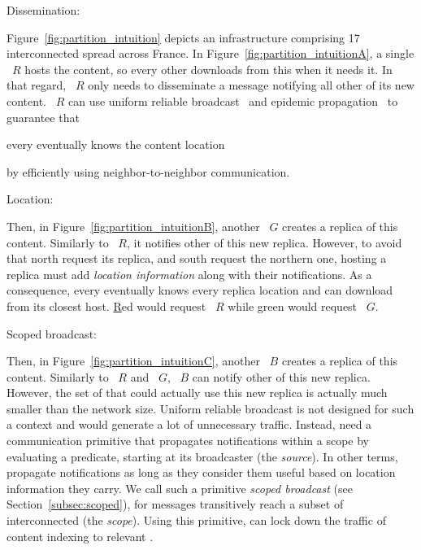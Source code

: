 \begin{asparadesc}
\item [Dissemination:]

Figure~\ref{fig:partition_intuition} depicts an infrastructure
comprising 17 interconnected \processes spread across France. In
Figure~\ref{fig:partition_intuitionA}, a single \Process~$R$ hosts the
content, so every other \process downloads from this \process when it
needs it. In that regard, \Process~$R$ only needs to disseminate a
message notifying all other \processes of its new
content. \Process~$R$ can use uniform reliable
broadcast~\cite{hadzilacos1994modular} and epidemic
propagation~\cite{epidemic-protocol} to guarantee that
\begin{inparaenum}[(i)]
\item every \process eventually knows the content location
\item by efficiently using neighbor-to-neighbor communication.
\end{inparaenum}

\item [Location:]

Then, in Figure~\ref{fig:partition_intuitionB}, another \Process~$G$
creates a replica of this content. Similarly to \Process~$R$, it
notifies other \processes of this new replica. However, to avoid that
north \processes request its replica, and south \processes request the
northern one, \processes hosting a replica must add \emph{location
information} along with their notifications. As a consequence, every
\process eventually knows every replica location and can download from
its closest host. \underline{R}ed \processes would request
\Process~$R$ while \underline{g}reen \processes would request
\Process~$G$.

\item [Scoped broadcast:]

Then, in Figure~\ref{fig:partition_intuitionC}, another \Process~$B$
creates a replica of this content. Similarly to \Process~$R$ and
\Process~$G$, \Process~$B$ can notify other \processes of this new
replica. However, the set of \processes that could actually use this
new replica is actually much smaller than the network size. Uniform
reliable broadcast is not designed for such a context and would
generate a lot of unnecessary traffic. Instead, \processes need a
communication primitive that propagates notifications within a scope
by evaluating a predicate, starting at its broadcaster (the
\emph{source}).  In other terms, \processes propagate notifications as
long as they consider them useful based on location information they
carry. We call such a primitive \emph{scoped broadcast} (see
Section~\ref{subsec:scoped}), for messages transitively reach a subset
of interconnected \processes (the \emph{scope}). Using this primitive,
\processes can lock down the traffic of content indexing to relevant
\processes.


\end{asparadesc}
